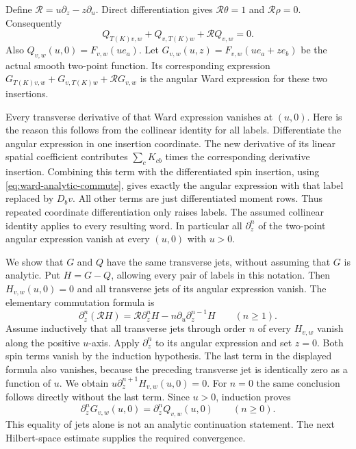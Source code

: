Define $\mathcal R=u\partial_z-z\partial_u$. Direct differentiation gives
$\mathcal R\theta=1$ and $\mathcal R\rho=0$. Consequently
\begin{equation}\label{eq:ward-comparator-pde}
 Q_{T(K)v,w}+Q_{v,T(K)w}+\mathcal RQ_{v,w}=0.
\end{equation}
Also $Q_{v,w}(u,0)=F_{v,w}(ue_a)$.
Let $G_{v,w}(u,z)=F_{v,w}(ue_a+ze_b)$ be the actual smooth two-point
function. Its corresponding expression
$G_{T(K)v,w}+G_{v,T(K)w}+\mathcal RG_{v,w}$ is the angular Ward expression
for these two insertions.

Every transverse derivative of that Ward expression vanishes at $(u,0)$.
Here is the reason this follows from the collinear identity for all labels.
Differentiate the angular expression in one insertion coordinate. The
new derivative of its linear spatial coefficient contributes
$\sum_c K_{cb}$ times the corresponding derivative insertion. Combining
this term with the differentiated spin insertion, using
\eqref{eq:ward-analytic-commute}, gives exactly the angular expression
with that label replaced by $D_bv$. All other terms are just differentiated
moment rows. Thus repeated coordinate differentiation only raises labels.
The assumed collinear identity applies to every resulting word. In
particular all $\partial_z^n$ of the two-point angular expression vanish
at every $(u,0)$ with $u>0$.

We show that $G$ and $Q$ have the same transverse jets, without assuming
that $G$ is analytic. Put $H=G-Q$, allowing every pair of labels in this
notation. Then $H_{v,w}(u,0)=0$ and all transverse jets of its angular
expression vanish. The elementary commutation formula is
\[
 \partial_z^n(\mathcal RH)
    =\mathcal R\partial_z^nH-n\partial_u\partial_z^{n-1}H
       \qquad(n\geq1).
\]
Assume inductively that all transverse jets through order $n$ of every
$H_{v,w}$ vanish along the positive $u$-axis. Apply $\partial_z^n$ to
its angular expression and set $z=0$. Both spin terms vanish by the
induction hypothesis. The last term in the displayed formula also
vanishes, because the preceding transverse jet is identically zero as a
function of $u$. We obtain
$u\partial_z^{n+1}H_{v,w}(u,0)=0$.
For $n=0$ the same conclusion follows directly without the last term.
Since $u>0$, induction proves
\begin{equation}\label{eq:ward-comparison-jets}
 \partial_z^nG_{v,w}(u,0)=\partial_z^nQ_{v,w}(u,0)
             \qquad(n\geq0).
\end{equation}
This equality of jets alone is not an analytic continuation statement.
The next Hilbert-space estimate supplies the required convergence.

